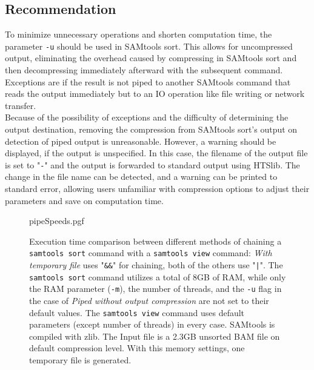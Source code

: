 \subsection{Recommendation}
To minimize unnecessary operations and shorten computation time, the parameter \texttt{-u} should be used in SAMtools sort. This allows for uncompressed output, eliminating the overhead caused by compressing in SAMtools sort and then decompressing immediately afterward with the subsequent command. \\
Exceptions are if the result is not piped to another SAMtools command that reads the output immediately but to an IO operation like  file writing or network transfer. \\
Because of the possibility of exceptions and the difficulty of determining the output destination, removing the compression from SAMtools sort's output on detection of piped output is unreasonable. However, a warning should be displayed, if the output is unspecified. In this case, the filename of the output file is set to "\texttt{-}" and the output is forwarded to standard output using HTSlib. The change in the file name can be detected, and a warning can be printed to standard error, allowing users unfamiliar with compression options to adjust their parameters and save on computation time.

\begin{figure}
    \begin{center}
        {pipeSpeeds.pgf}
    \end{center}
    \caption{Execution time comparison between different methods of chaining a \texttt{samtools sort} command with a \texttt{samtools view} command: \textit{With temporary file} uses "\texttt{\&\&}" for chaining, both of the others use "\texttt{|}". The \texttt{samtools sort} command utilizes a total of 8GB of RAM, while only the RAM parameter (\texttt{-m}), the number of threads, and the \texttt{-u} flag in the case of \textit{Piped without output compression} are not set to their default values.
    The \texttt{samtools view} command uses default parameters (except number of threads) in every case. SAMtools is compiled with zlib. The Input file is a 2.3GB unsorted BAM file on default compression level. With this memory settings, one temporary file is generated.
    }
\end{figure}



